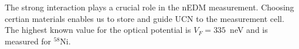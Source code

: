 The strong interaction plays a crucial role in the nEDM
measurement. Choosing certian materials enables us to store and guide
UCN to the measurement cell.  The highest known value for the optical
potential is $V_F=335$~neV and is measured for $^{58}$Ni.






